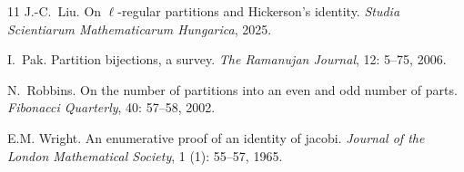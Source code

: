\documentclass[12pt,reqno]{amsart}
\numberwithin{equation}{section}
\begin{document}
\begin{thebibliography}{11}
J.-C.~Liu.
\newblock On $\ell$-regular partitions and Hickerson’s identity.
\newblock \emph{Studia Scientiarum Mathematicarum Hungarica}, 2025.

I.~Pak.
\newblock Partition bijections, a survey.
\newblock \emph{The Ramanujan Journal}, 12: 5--75, 2006.

N.~Robbins.
\newblock On the number of partitions into an even and odd number of parts.
\newblock \emph{Fibonacci Quarterly}, 40: 57--58, 2002.

E.M. Wright.
\newblock An enumerative proof of an identity of jacobi.
\newblock \emph{Journal of the London Mathematical Society}, 1 (1): 55--57, 1965.

\end{thebibliography}  
\end{document}
